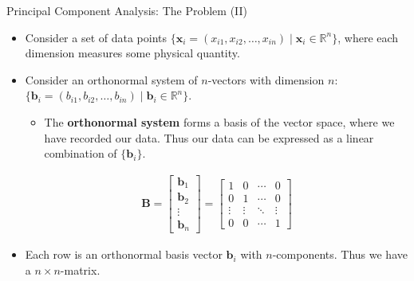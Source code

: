 \begin{frame}{Principal Component Analysis: The Problem (II)}
	\begin{itemize}
		\item Consider a set of data points $\{\mathbf{x}_i = 
		(x_{i1},x_{i2},\ldots,x_{in}) \; \vert \; \mathbf{x}_i \in \mathbb{R}^n 
		\}$, where each dimension measures some physical quantity.
		\item Consider an orthonormal system of $n$-vectors with dimension $n$: 
		$\{\mathbf{b}_i = (b_{i1},b_{i2},\ldots,b_{in}) \; \vert \; 
		\mathbf{b}_i \in \mathbb{R}^n \}$.
		\begin{itemize}
			\item The \textbf{orthonormal system} forms a basis of the vector 
			space, where we have recorded our data. Thus our data can be 
			expressed as a linear combination of $\{\mathbf{b}_i\}$.
		\end{itemize}
		\begin{align}
			\mathbf{B} = \begin{bmatrix}
				\mathbf{b}_1 \\
				\mathbf{b}_2 \\
				\vdots \\
				\mathbf{b}_n
			\end{bmatrix} = \begin{bmatrix}
				1      & 0      & \cdots & 0      \\
				0      & 1      & \cdots & 0      \\
				\vdots & \vdots & \ddots & \vdots \\
				0      & 0      & \cdots & 1      
			\end{bmatrix}
		\end{align}
		\item Each row is an orthonormal basis vector $\mathbf{b}_i$ with 
		$n$-components. Thus we have a $n \times n$-matrix.
	\end{itemize}
\end{frame}

